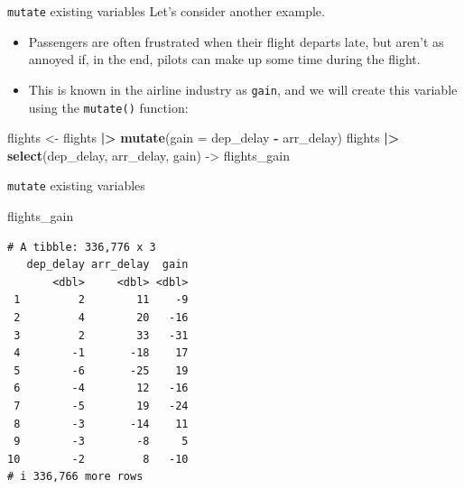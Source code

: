 \documentclass[
  ignorenonframetext,
]{beamer}
\newenvironment{Shaded}{\begin{snugshade}}{\end{snugshade}}
\newcommand{\AttributeTok}[1]{\textcolor[rgb]{0.13,0.29,0.53}{#1}}
\newcommand{\FunctionTok}[1]{\textcolor[rgb]{0.13,0.29,0.53}{\textbf{#1}}}
\newcommand{\NormalTok}[1]{#1}
\newcommand{\OtherTok}[1]{\textcolor[rgb]{0.56,0.35,0.01}{#1}}
\newcommand{\SpecialCharTok}[1]{\textcolor[rgb]{0.81,0.36,0.00}{\textbf{#1}}}
\begin{document}
\begin{frame}[fragile]{\texttt{mutate} existing variables}
\label{mutate-existing-variables-4}
Let's consider another example.

\begin{itemize}
\item
  Passengers are often frustrated when their flight departs late, but
  aren't as annoyed if, in the end, pilots can make up some time during
  the flight.
\item
  This is known in the airline industry as \texttt{gain}, and we will
  create this variable using the \texttt{mutate()} function:
\end{itemize}

\normalsize

\begin{Shaded}
\begin{Highlighting}[]
\NormalTok{flights }\OtherTok{\textless{}{-}}\NormalTok{ flights }\SpecialCharTok{|\textgreater{}} 
  \FunctionTok{mutate}\NormalTok{(}\AttributeTok{gain =}\NormalTok{ dep\_delay }\SpecialCharTok{{-}}\NormalTok{ arr\_delay)}
\NormalTok{flights  }\SpecialCharTok{|\textgreater{}} 
  \FunctionTok{select}\NormalTok{(dep\_delay, arr\_delay, gain) }\OtherTok{{-}\textgreater{}}\NormalTok{ flights\_gain}
\end{Highlighting}
\end{Shaded}

\normalsize
\end{frame}

\begin{frame}[fragile]{\texttt{mutate} existing variables}
\label{mutate-existing-variables-5}
\begin{Shaded}
\begin{Highlighting}[]
\NormalTok{flights\_gain}
\end{Highlighting}
\end{Shaded}

\begin{verbatim}
# A tibble: 336,776 x 3
   dep_delay arr_delay  gain
       <dbl>     <dbl> <dbl>
 1         2        11    -9
 2         4        20   -16
 3         2        33   -31
 4        -1       -18    17
 5        -6       -25    19
 6        -4        12   -16
 7        -5        19   -24
 8        -3       -14    11
 9        -3        -8     5
10        -2         8   -10
# i 336,766 more rows
\end{verbatim}
\end{frame}
\end{document}
